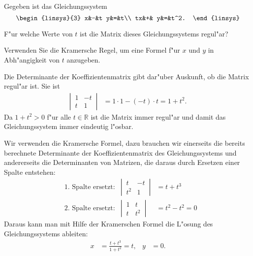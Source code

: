 Gegeben ist das Gleichungssystem
\[
\begin{linsys}{3}
 x&-&t y&=&t\\
tx&+&  y&=&t^2.
\end{linsys}
\]
\begin{teilaufgaben}
\item F"ur welche Werte von $t$ ist die Matrix dieses Gleichungssystems
regul"ar?
\item
Verwenden Sie die Kramersche Regel, um 
eine Formel f"ur $x$ und $y$ in Abh"angigkeit von $t$ anzugeben.
\end{teilaufgaben}

\begin{loesung}
\begin{teilaufgaben}
\item
Die Determinante der Koeffizientenmatrix gibt dar"uber Auskunft, ob die
Matrix regul"ar ist. Sie ist
\begin{align*}
\left|\,\begin{matrix}1&-t\\t&1\end{matrix}\,\right|
&=1\cdot 1-(-t)\cdot t=1+t^2.
\end{align*}
Da $1+t^2>0$ f"ur alle $t\in\mathbb R$ ist die Matrix immer regul"ar und
damit das Gleichungssystem immer eindeutig l"osbar.
\item
Wir verwenden die Kramersche Formel, dazu brauchen wir einerseits die bereits
berechnete Determinante der Koeffizientenmatrix des Gleichungssystems
und andererseits die Determinanten von Matrizen, die daraus durch Ersetzen
einer Spalte entstehen:
\begin{align*}
&\text{1.~Spalte ersetzt:}&
\left|\,\begin{matrix}t&-t\\t^2&1\end{matrix}\,\right|
&=t+t^3
\\
&\text{2.~Spalte ersetzt:}&
\left|\,\begin{matrix}1&t\\t&t^2\end{matrix}\,\right|
&=t^2-t^2=0
\end{align*}
Daraus kann man mit Hilfe der Kramerschen Formel die L"osung des
Gleichungssystems ableiten:
\begin{align*}
x&=\frac{t+t^3}{1+t^2}=t,&
y&=0.
\end{align*}
\end{teilaufgaben}
\end{loesung}
